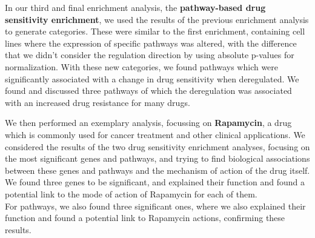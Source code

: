 In our third and final enrichment analysis, the \textbf{pathway-based drug sensitivity enrichment}, we used the results of the previous enrichment analysis to generate categories. These were similar to the first enrichment, containing cell lines where the expression of specific pathways was altered, with the difference that we didn't consider the regulation direction by using absolute p-values for normalization. With these new categories, we found pathways which were significantly associated with a change in drug sensitivity when deregulated. We found and discussed three pathways of which the deregulation was associated with an increased drug resistance for many drugs.

We then performed an exemplary analysis, focussing on \textbf{Rapamycin}, a drug which is commonly used for cancer treatment and other clinical applications. We considered the results of the two drug sensitivity enrichment analyses, focusing on the most significant genes and pathways, and trying to find biological associations between these genes and pathways and the mechanism of action of the drug itself.\\
We found three genes to be significant, and explained their function and found a potential link to the mode of action of Rapamycin for each of them.\\
For pathways, we also found three significant ones, where we also explained their function and found a potential link to Rapamycin actions, confirming these results.

